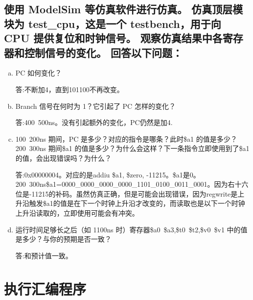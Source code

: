 \documentclass{ctexart}
\begin{document}
        \subsection  { 使用 ModelSim 等仿真软件进行仿真。 仿真顶层模块为 test\_cpu，这是一个 testbench，用于向 CPU 提供复位和时钟信号。 观察仿真结果中各寄存器和控制信号的变化。 回答以下问题：}
        \begin{enumerate}[a)] 
            \item{ PC 如何变化？}

              答:不断加4，直到101100不再改变。

            \item{Branch 信号在何时为 1？它引起了 PC 怎样的变化？}

              答:400~500ns。没有引起额外的变化，PC仍然是加4.

           \item{100~200ns 期间，PC 是多少？对应的指令是哪条？此时\$a1 的值是多少？200~300ns 期间\$a1 的值是多少？为什么会这样？下一条指令立即使用到了\$a1 的值，会出现错误吗？为什么？}
    
                答:0x00000004。对应的是addiu \$a1, \$zero, -11215。\$a1是0。200~300ns\$a1=0000\_0000\_0000\_0000\_1101\_0100\_0011\_0001。因为右十六位是-11215的补码。虽然仿真正确，但是可能会出现错误，因为regwrite是上升沿触发\$a1的值是在下一个时钟上升沿才改变的，而读取也是以下一个时钟上升沿读取的，立即使用可能会有冲突。

            \item{运行时间足够长之后（如 1100ns 时）寄存器\$a0~\$a3,\$t0~\$t2,\$v0~\$v1 中的值是多少？与你的预期是否一致？}

        答:和预计值一致。
  \end{enumerate}
\section{执行汇编程序}
\end{document}
